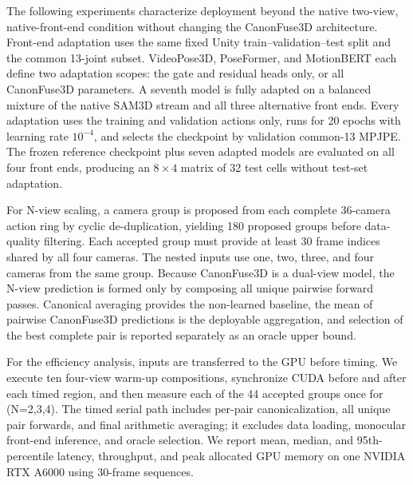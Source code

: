 \documentclass[11pt,letterpaper]{article}
\begin{document}
The following experiments characterize deployment beyond the native two-view, native-front-end condition without changing the CanonFuse3D architecture. Front-end adaptation uses the same fixed Unity train--validation--test split and the common 13-joint subset. VideoPose3D, PoseFormer, and MotionBERT each define two adaptation scopes: the gate and residual heads only, or all CanonFuse3D parameters. A seventh model is fully adapted on a balanced mixture of the native SAM3D stream and all three alternative front ends. Every adaptation uses the training and validation actions only, runs for 20 epochs with learning rate \(10^{-4}\), and selects the checkpoint by validation common-13 MPJPE. The frozen reference checkpoint plus seven adapted models are evaluated on all four front ends, producing an \(8\times4\) matrix of 32 test cells without test-set adaptation.

For N-view scaling, a camera group is proposed from each complete 36-camera action ring by cyclic de-duplication, yielding 180 proposed groups before data-quality filtering. Each accepted group must provide at least 30 frame indices shared by all four cameras. The nested inputs use one, two, three, and four cameras from the same group. Because CanonFuse3D is a dual-view model, the N-view prediction is formed only by composing all unique pairwise forward passes. Canonical averaging provides the non-learned baseline, the mean of pairwise CanonFuse3D predictions is the deployable aggregation, and selection of the best complete pair is reported separately as an oracle upper bound.

For the efficiency analysis, inputs are transferred to the GPU before timing. We execute ten four-view warm-up compositions, synchronize CUDA before and after each timed region, and then measure each of the 44 accepted groups once for (N=2,3,4). The timed serial path includes per-pair canonicalization, all unique pair forwards, and final arithmetic averaging; it excludes data loading, monocular front-end inference, and oracle selection. We report mean, median, and 95th-percentile latency, throughput, and peak allocated GPU memory on one NVIDIA RTX A6000 using 30-frame sequences.
\end{document}
